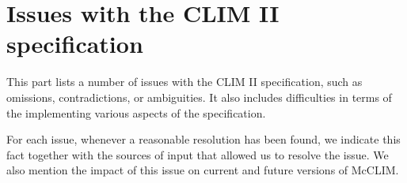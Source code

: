 \part{Issues with the CLIM II specification}

This part lists a number of issues with the CLIM II specification,
such as omissions, contradictions, or ambiguities.  It also includes
difficulties in terms of the implementing various aspects of the
specification.

For each issue, whenever a reasonable resolution has been found, we
indicate this fact together with the sources of input that allowed us
to resolve the issue.  We also mention the impact of this issue on
current and future versions of McCLIM.

